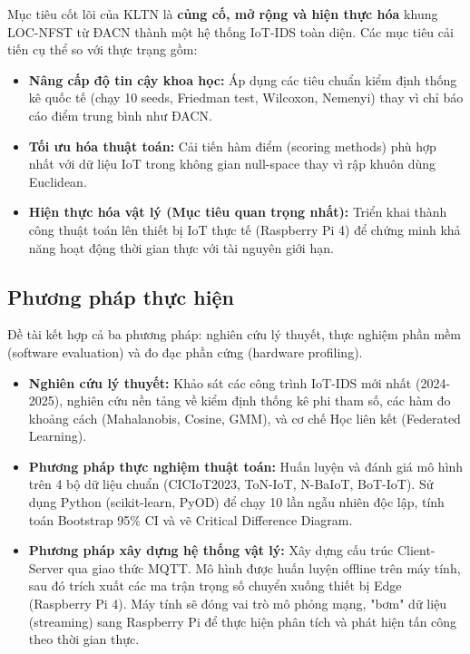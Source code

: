 \documentclass[12pt,a4paper]{article}
\begin{document}
Mục tiêu cốt lõi của KLTN là \textbf{củng cố, mở rộng và hiện thực hóa} khung LOC-NFST từ ĐACN thành một hệ thống IoT-IDS toàn diện. Các mục tiêu cải tiến cụ thể so với thực trạng gồm:
\begin{itemize}
    \item \textbf{Nâng cấp độ tin cậy khoa học:} Áp dụng các tiêu chuẩn kiểm định thống kê quốc tế (chạy 10 seeds, Friedman test, Wilcoxon, Nemenyi) thay vì chỉ báo cáo điểm trung bình như ĐACN.
    \item \textbf{Tối ưu hóa thuật toán:} Cải tiến hàm điểm (scoring methods) phù hợp nhất với dữ liệu IoT trong không gian null-space thay vì rập khuôn dùng Euclidean.
    \item \textbf{Hiện thực hóa vật lý (Mục tiêu quan trọng nhất):} Triển khai thành công thuật toán lên thiết bị IoT thực tế (Raspberry Pi 4) để chứng minh khả năng hoạt động thời gian thực với tài nguyên giới hạn.
\end{itemize}

\subsection{Phương pháp thực hiện}

Đề tài kết hợp cả ba phương pháp: nghiên cứu lý thuyết, thực nghiệm phần mềm (software evaluation) và đo đạc phần cứng (hardware profiling).
\begin{itemize}
    \item \textbf{Nghiên cứu lý thuyết:} Khảo sát các công trình IoT-IDS mới nhất (2024-2025), nghiên cứu nền tảng về kiểm định thống kê phi tham số, các hàm đo khoảng cách (Mahalanobis, Cosine, GMM), và cơ chế Học liên kết (Federated Learning).
    \item \textbf{Phương pháp thực nghiệm thuật toán:} Huấn luyện và đánh giá mô hình trên 4 bộ dữ liệu chuẩn (CICIoT2023, ToN-IoT, N-BaIoT, BoT-IoT). Sử dụng Python (scikit-learn, PyOD) để chạy 10 lần ngẫu nhiên độc lập, tính toán Bootstrap 95\% CI và vẽ Critical Difference Diagram.
    \item \textbf{Phương pháp xây dựng hệ thống vật lý:} Xây dựng cấu trúc Client-Server qua giao thức MQTT. Mô hình được huấn luyện offline trên máy tính, sau đó trích xuất các ma trận trọng số chuyển xuống thiết bị Edge (Raspberry Pi 4). Máy tính sẽ đóng vai trò mô phỏng mạng, "bơm" dữ liệu (streaming) sang Raspberry Pi để thực hiện phân tích và phát hiện tấn công theo thời gian thực.
\end{itemize}
\end{document}
